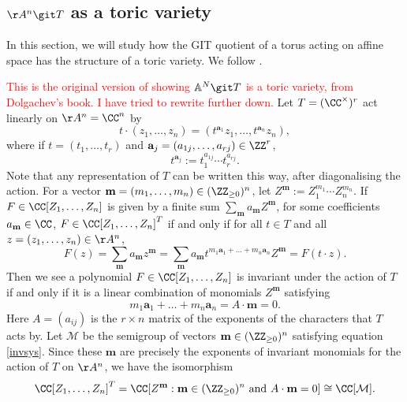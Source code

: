 \subsection{$\AA^n \git T$ as a toric variety}
In this section, we will study how the GIT quotient of a torus acting on affine space has the structure of a toric variety.
We follow \cite[\S 12]{Dolgachev03}.

\textcolor{red}{This is the original version of showing $\mathbb{A}^N \git T$ is a toric variety, from Dolgachev's book. I have tried to rewrite further down.}
Let $T = (\CC^\times)^r$ act linearly on $\AA^n = \CC^n$ by
$$t \cdot (z_1, \ldots, z_n) = (t^{\mathbf{a}_1} z_1, \ldots, t^{\mathbf{a}_n} z_n),$$
where if $t = (t_1, \ldots, t_r)$ and $\mathbf{a}_j = (a_{1j}, \ldots, a_{rj}) \in \ZZ^r$,
$$t^{\mathbf{a}_j} := t_1^{a_{1j}} \cdots t_r^{a_{rj}}.$$
Note that any representation of $T$ can be written this way, after diagonalising the action.
For a vector $\mathbf{m} =(m_1, \ldots, m_n) \in (\ZZ_{\ge 0})^n$, let $Z^\mathbf{m}:=Z_1^{m_1} \cdots Z_n^{m_n}$.
If $F \in \CC[Z_1, \ldots, Z_n]$ is given by a finite sum $\sum_{\mathbf{m}} a_{\mathbf{m}} Z^\mathbf{m}$, for some coefficients $a_{\mathbf{m}} \in \CC$, $F \in \CC[Z_1, \ldots, Z_n]^T$ if and only if for all $t \in T$ and all $z =(z_1,\ldots,z_n)\in\AA^n$,
$$F(z) = \sum_{\mathbf{m}} a_{\mathbf{m}} z^\mathbf{m} = \sum_{\mathbf{m}} a_{\mathbf{m}} t^{m_1 \mathbf{a}_1 + \ldots + m_n \mathbf{a}_n} Z^\mathbf{m} = F(t \cdot z).$$
Then we see a polynomial $F \in \CC[Z_1, \ldots, Z_n]$ is invariant under the action of $T$ if and only if it is a linear combination of monomials $Z^\mathbf{m}$ satisfying
\begin{equation}\label{invsys}
	m_1 \mathbf{a}_1 + \ldots + m_n \mathbf{a}_n = A \cdot \mathbf{m} = 0.
\end{equation}
Here $A = (a_{ij})$ is the $r \times n$ matrix of the exponents of the characters that $T$ acts by.       %
Let $\mathcal{M}$ be the semigroup of vectors $\mathbf{m} \in (\ZZ_{\ge 0})^n$ satisfying equation \ref{invsys}.
Since these $\mathbf{m}$ are precisely the exponents of invariant monomials for the action of $T$ on $\AA^n$, we have the isomorphism
$$\CC[Z_1, \ldots, Z_n]^T = \CC[Z^\mathbf{m} : \mathbf{m}\in (\ZZ_{\ge 0})^n \text{ and } A \cdot \mathbf{m} = 0] \cong \CC[\mathcal{M}].$$

